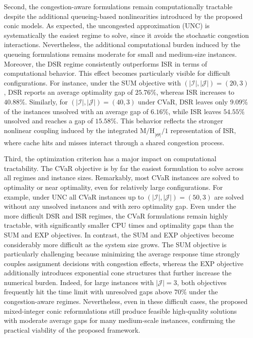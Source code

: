 \documentclass[a4paper,11pt,reqno]{amsart}
\newcommand{\J}{\mathcal{J}}
\begin{document}
Second, the congestion-aware formulations remain computationally tractable despite the additional queueing-based nonlinearities introduced by the proposed conic models. As expected, the uncongested approximation (UNC) is systematically the easiest regime to solve, since it avoids the stochastic congestion interactions. Nevertheless, the additional computational burden induced by the queueing formulations remains moderate for small and medium-size instances. Moreover, the DSR regime consistently outperforms ISR in terms of computational behavior. This effect becomes particularly visible for difficult configurations. For instance, under the SUM objective with $(|\mathcal I|,|\J|)=(20,3)$, DSR reports an average optimality gap of $25.76\%$, whereas ISR increases to $40.88\%$. Similarly, for $(|\mathcal I|,|\J|)=(40,3)$ under CVaR, DSR leaves only $9.09\%$ of the instances unsolved with an average gap of $6.16\%$, while ISR leaves $54.55\%$ unsolved and reaches a gap of $15.58\%$. This behavior reflects the stronger nonlinear coupling induced by the integrated $\mathrm{M/H}_{|\Theta|}/1$ representation of ISR, where cache hits and misses interact through a shared congestion process.

Third, the optimization criterion has a major impact on computational tractability. The CVaR objective is by far the easiest formulation to solve across all regimes and instance sizes. Remarkably, most CVaR instances are solved to optimality or near optimality, even for relatively large configurations. For example, under UNC all CVaR instances up to $(|\mathcal I|,|\J|)=(50,3)$ are solved without any unsolved instances and with zero optimality gap. Even under the more difficult DSR and ISR regimes, the CVaR formulations remain highly tractable, with significantly smaller CPU times and optimality gaps than the SUM and EXP objectives. In contrast, the SUM and EXP objectives become considerably more difficult as the system size grows. The SUM objective is particularly challenging because minimizing the average response time strongly couples assignment decisions with congestion effects, whereas the EXP objective additionally introduces exponential cone structures that further increase the numerical burden. Indeed, for large instances with $|\J|=3$, both objectives frequently hit the time limit with unresolved gaps above $70\%$ under the congestion-aware regimes. Nevertheless, even in these difficult cases, the proposed mixed-integer conic reformulations still produce feasible high-quality solutions with moderate average gaps for many medium-scale instances, confirming the practical viability of the proposed framework.
\end{document}
